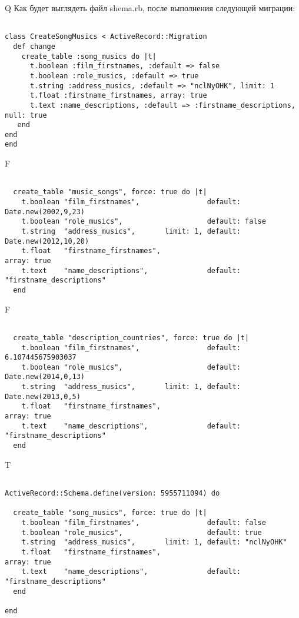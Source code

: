 Q
Как будет выглядеть файл shema.rb, после выполнения следующей миграции:

\begin{verbatim}

class CreateSongMusics < ActiveRecord::Migration 
  def change 
    create_table :song_musics do |t| 
      t.boolean :film_firstnames, :default => false
      t.boolean :role_musics, :default => true
      t.string :address_musics, :default => "nclNyOHK", limit: 1
      t.float :firstname_firstnames, array: true
      t.text :name_descriptions, :default => :firstname_descriptions, null: true
   end
end
end
\end{verbatim}

F
\begin{verbatim}

  create_table "music_songs", force: true do |t|
    t.boolean "film_firstnames",                default: Date.new(2002,9,23)
    t.boolean "role_musics",                    default: false
    t.string  "address_musics",       limit: 1, default: Date.new(2012,10,20)
    t.float   "firstname_firstnames",                                              array: true
    t.text    "name_descriptions",              default: "firstname_descriptions"
  end

\end{verbatim}

F
\begin{verbatim}

  create_table "description_countries", force: true do |t|
    t.boolean "film_firstnames",                default: 6.107445675903037
    t.boolean "role_musics",                    default: Date.new(2014,0,13)
    t.string  "address_musics",       limit: 1, default: Date.new(2013,0,5)
    t.float   "firstname_firstnames",                                              array: true
    t.text    "name_descriptions",              default: "firstname_descriptions"
  end

\end{verbatim}

T
\begin{verbatim}

ActiveRecord::Schema.define(version: 5955711094) do

  create_table "song_musics", force: true do |t|
    t.boolean "film_firstnames",                default: false
    t.boolean "role_musics",                    default: true
    t.string  "address_musics",       limit: 1, default: "nclNyOHK"
    t.float   "firstname_firstnames",                                              array: true
    t.text    "name_descriptions",              default: "firstname_descriptions"
  end

end
\end{verbatim}


